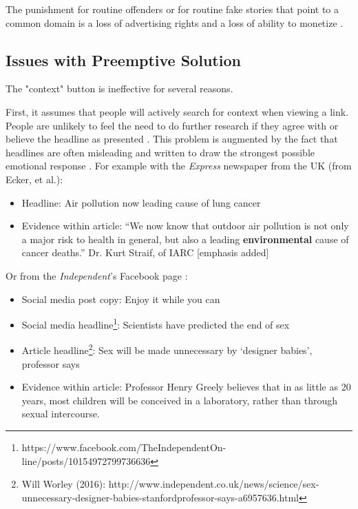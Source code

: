  The punishment for routine offenders or for routine fake stories that point to a common domain is a loss of advertising rights and a loss of ability to monetize \citep{facebook_2020}.
 
 \subsection{Issues with Preemptive Solution}
 The "context" button is ineffective for several reasons. 
 
 First, it assumes that people will actively search for context when viewing a link. People are unlikely to feel the need to do further research if they agree with or believe the headline as presented \citep{nyhan2010corrections}. This problem is augmented by the fact that headlines are often misleading and written to draw the strongest possible emotional response \citep{chesney2017incongruent,ecker2014effects,bell1984good,molek2013towards,kilgo2018new,vettehen2008explaining}. For example with the \textit{Express} newspaper from the UK (from Ecker, et al.):
 \begin{itemize}
 \item Headline: Air pollution now leading cause of lung cancer
\item Evidence within article: “We now know that outdoor air pollution is not only a major risk to health in general, but also a leading \textbf{environmental} cause of cancer deaths.” Dr. Kurt Straif, of IARC [emphasis added]
 \end{itemize}
 
 Or from the \textit{Independent}'s Facebook page \citep{chesney2017incongruent}:
 \begin{itemize}
\item Social media post copy: Enjoy it while you
can
\item Social media headline\footnote{https://www.facebook.com/TheIndependentOn-line/posts/10154972799736636}: Scientists have predicted the end of sex
\item Article headline\footnote{Will Worley (2016): http://www.independent.co.uk/news/science/sex-unnecessary-designer-babies-stanfordprofessor-says-a6957636.html}: Sex will be made unnecessary by ‘designer babies’, professor says
\item Evidence within article: Professor Henry Greely believes that in as little as 20 years, most children will be conceived in a laboratory, rather than through sexual intercourse.
 \end{itemize}
 
